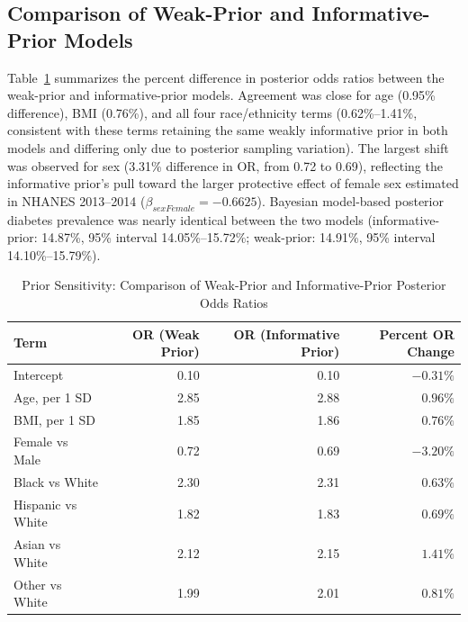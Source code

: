 \documentclass[11pt]{article}
\begin{document}
\subsection{Comparison of Weak-Prior and Informative-Prior Models}
Table~\ref{tab:sensitivity} summarizes the percent difference in posterior
odds ratios between the weak-prior and informative-prior models. Agreement
was close for age (0.95\% difference), BMI (0.76\%), and all four
race/ethnicity terms (0.62\%--1.41\%, consistent with these terms retaining
the same weakly informative prior in both models and differing only due to
posterior sampling variation). The largest shift was observed for sex
(3.31\% difference in OR, from 0.72 to 0.69), reflecting the informative
prior's pull toward the larger protective effect of female sex estimated in
NHANES 2013--2014 ($\beta_{sexFemale}=-0.6625$). Bayesian model-based
posterior diabetes prevalence was nearly identical between the two models
(informative-prior: 14.87\%, 95\% interval 14.05\%--15.72\%; weak-prior:
14.91\%, 95\% interval 14.10\%--15.79\%).



\begin{table}[H]
\centering
\caption{Prior Sensitivity: Comparison of Weak-Prior and Informative-Prior
Posterior Odds Ratios}
\label{tab:sensitivity}
\begin{tabular}{lrrr}
\toprule
\textbf{Term} & \textbf{OR (Weak Prior)} & \textbf{OR (Informative Prior)} &
\textbf{Percent OR Change} \\
\midrule
Intercept & 0.10 & 0.10 & $-0.31\%$ \\
Age, per 1 SD & 2.85 & 2.88 & $0.96\%$ \\
BMI, per 1 SD & 1.85 & 1.86 & $0.76\%$ \\
Female vs Male & 0.72 & 0.69 & $-3.20\%$ \\
Black vs White & 2.30 & 2.31 & $0.63\%$ \\
Hispanic vs White & 1.82 & 1.83 & $0.69\%$ \\
Asian vs White & 2.12 & 2.15 & $1.41\%$ \\
Other vs White & 1.99 & 2.01 & $0.81\%$ \\
\bottomrule
\end{tabular}
\end{table}
\end{document}
